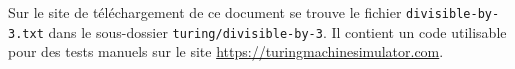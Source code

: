 Sur le site de téléchargement de ce document se trouve le fichier \verb+divisible-by-3.txt+ dans le sous-dossier \verb+turing/divisible-by-3+.
Il contient un code utilisable pour des tests manuels sur le site \url{https://turingmachinesimulator.com}.